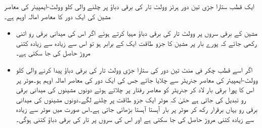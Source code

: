 ایک  قطب ستارا جڑی تین دور  ہرٹز  وولٹ تار کی برقی دباؤ پر چلنے والی  کلو وولٹ-ایمپیئر کی معاصر مشین کی ایک دور کا معاصر امالہ  اوہم ہے۔
\begin{itemize}
\item
مشین کے برقی سروں پر  وولٹ تار کی برقی دباؤ مہیا کرتے ہوئے اگر اس کی میدانی برقی رو اتنی رکھی جائے کہ پورے بار پر مشین کا جزو طاقت ایک کے برابر ہو تو اس سے زیادہ سے زیادہ کتنی مروڑ حاصل کی جا سکتی ہے۔
\item
اگر اسے    قطب   چکر فی منٹ تین دور کی ستارا جڑی  وولٹ تار کی برقی دباؤ پیدا کرنے والی   کلو وولٹ-ایمپیئر کی معاصر جنریٹر سے چلایا جائے جس کی ایک دور کی معاصر امالہ  اوہم ہو۔موٹر پر اس کا پورا برقی بار لاد کر جنریٹر کو معاصر رفتار پر چلاتے ہوئے دونوں مشینوں کی میدانی برقی رو تبدیل کی جاتی ہے حتیٰ کہ موٹر ایک جزو طاقت پر چلنے لگے۔دونوں مشینوں کی میدانی برقی رو یہاں برقرار رکھ کر موٹر پر بار آہستا آہستا بڑھائی جاتی ہے۔اس صورت میں موٹر سے زیادہ سے زیادہ کتنی مروڑ  حاصل کی جا سکتی ہے اور اس کی سروں پر تار کی برقی دباؤ کتنی ہوگی۔ 
\end{itemize}

